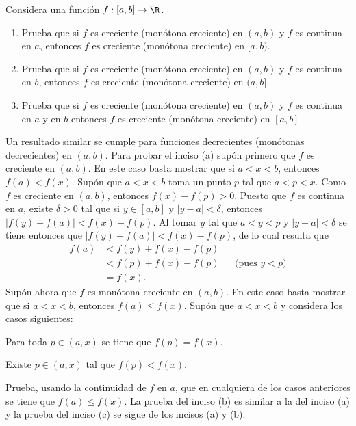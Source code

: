 \documentclass[12pt,a4paper]{book}
\begin{document}
    \begin{ejercicio}\label{ej:206}
        Considera una función $f:[a,b]\to\R$.
        \begin{enumerate}[nosep]
            \item Prueba que si $f$ es creciente (monótona creciente) en $(a,b)$ y $f$ es continua
            en $a$, entonces $f$ es creciente (monótona creciente) en $[a,b)$.
            \item Prueba que si $f$ es creciente (monótona creciente) en $(a,b)$ y $f$ es continua
            en $b$, entonces $f$ es creciente (monótona creciente) en $(a,b]$.
            \item Prueba que si $f$ es creciente (monótona creciente) en $(a,b)$ y $f$ es continua
            en $a$ y en $b$ entonces $f$ es creciente (monótona creciente) en $[a,b]$.
        \end{enumerate}
        Un resultado similar se cumple para funciones decrecientes (monótonas decrecientes)
        en $(a,b)$. \sugerencia Para probar el inciso (a) supón primero
        que $f$ es creciente en $(a,b)$. En este caso basta mostrar que si $a<x<b$,
        entonces $f(a)<f(x)$. Supón que $a<x<b$ toma un punto $p$ tal que
        $a<p<x$. Como $f$ es creciente en $(a,b)$, entonces $f(x)-f(p)>0$. Puesto
        que $f$ es continua en $a$, existe $\delta>0$ tal que si $y\in[a,b]$ y $|y-a|<\delta$, entonces
        $|f(y)-f(a)|<f(x)-f(p)$. Al tomar $y$ tal que $a<y<p$ y $|y-a|<\delta$ se
        tiene entonces que $|f(y)-f(a)|<f(x)-f(p)$, de lo cual resulta que
        \begin{align*}
            f(a)&<f(y)+f(x)-f(p)\\
            &<f(p)+f(x)-f(p) &&\text{(pues $y<p$)}\\
            &=f(x).
        \end{align*}
        Supón ahora que $f$ es monótona creciente en $(a,b)$. En este caso basta mostrar
        que si $a<x<b$, entonces $f(a)\leq f(x)$. Supón que $a<x<b$ y
        considera los casos siguientes:
        \begin{description}[nosep,font=\normalfont]
            \item[Caso 1:] Para toda $p\in(a,x)$ se tiene que $f(p)=f(x)$.
            \item[Caso 2:] Existe $p\in(a,x)$ tal que $f(p)<f(x)$.
        \end{description}
        Prueba, usando la continuidad de $f$ en $a$, que en cualquiera de los casos
        anteriores se tiene que $f(a)\leq f(x)$. La prueba del inciso (b) es similar a la
        del inciso (a) y la prueba del inciso (c) se sigue de los incisos (a) y (b).
    \end{ejercicio}
\end{document}
